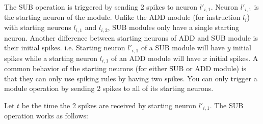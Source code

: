 \documentclass[runningheads,a4paper]{llncs}
\begin{document}
The SUB operation is triggered by sending 2 spikes to neuron $l'_{i,1}$. Neuron $l'_{i,1}$ is the starting neuron of the module. Unlike the ADD
module (for instruction $l_i$) with starting neurons $l_{i,1}$ and $l_{i,2}$, SUB modules only have a single starting neuron. Another difference 
between starting neurons of ADD and SUB module is their initial spikes. i.e. Starting neuron $l'_{i,1}$ of a SUB module will have $y$ initial
spikes while a starting neuron $l_{i,1}$ of an ADD module will have $x$ initial spikes. A common behavior of the starting neurons (for either SUB 
or ADD module) is that they can only use spiking rules by having two spikes. You can only trigger a module operation by sending 2 spikes to all
of its starting neurons.

Let $t$ be the time the 2 spikes are received by starting neuron $l'_{i,1}$. The SUB operation works as follows:
\end{document}
